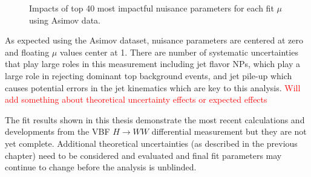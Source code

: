 \begin{figure}[!h]
{  }\hfill
{\caption{Impacts of top 40 most impactful nuisance parameters for each fit $\mu$ using Asimov data.
\label{fig:impacts}}}
\end{figure}

As expected using the Asimov dataset, nuisance parameters are centered at zero and floating $\mu$ values center at 1. There are number of systematic uncertainties that play large roles in this measurement including jet flavor NPs, which play a large role in rejecting dominant top background events, and jet pile-up which causes potential errors in the jet kinematics which are key to this analysis. \textcolor{red}{Will add something about theoretical uncertainty effects or expected effects}

The fit results shown in this thesis demonstrate the most recent calculations and developments from the VBF $H\rightarrow WW$ differential measurement but they are not yet complete. Additional theoretical uncertainties (as described in the previous chapter) need to be considered and evaluated and final fit parameters may continue to change before the analysis is unblinded. 

